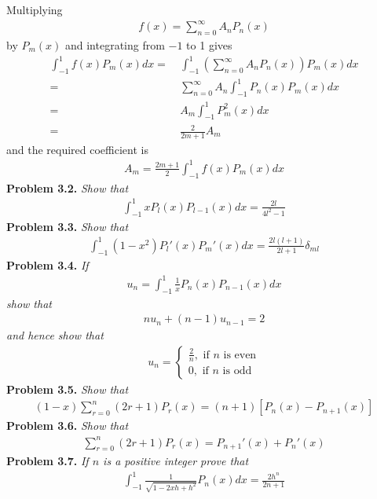\documentclass[a4paper]{article}
\numberwithin{equation}{section}
\begin{document}
Multiplying 
\begin{align}
f\left( x \right) = \sum\limits_{n = 0}^\infty  {{A_n}{P_n}\left( x \right)} 
\end{align}
by $P_m\left(x\right)$ and integrating from $-1$ to 1 gives
\begin{align}
\int_{ - 1}^1 {f\left( x \right){P_m}\left( x \right)dx}  =&\ \int_{ - 1}^1 {\left( {\sum\limits_{n = 0}^\infty  {{A_n}{P_n}\left( x \right)} } \right){P_m}\left( x \right)dx} \\
 =&\ \sum\limits_{n = 0}^\infty  {{A_n}\int_{ - 1}^1 {{P_n}\left( x \right){P_m}\left( x \right)dx} } \\
=&\ {A_m}\int_{ - 1}^1 {P_m^2\left( x \right)dx} \\
 =&\ \frac{2}{{2m + 1}}{A_m}
\end{align}
and the required coefficient is
\begin{align}
{A_m} = \frac{{2m + 1}}{2}\int_{ - 1}^1 {f\left( x \right){P_m}\left( x \right)dx} 
\end{align}
\textbf{Problem 3.2.} \textit{Show that}
\begin{align}
\int_{ - 1}^1 {x{P_l}\left( x \right){P_{l - 1}}\left( x \right)dx}  = \frac{{2l}}{{4{l^2} - 1}}
\end{align}
\textbf{Problem 3.3.} \textit{Show that}
\begin{align}
\int_{ - 1}^1 {\left( {1 - {x^2}} \right){P_l}'\left( x \right){P_m}'\left( x \right)dx}  = \frac{{2l\left( {l + 1} \right)}}{{2l + 1}}{\delta _{ml}}
\end{align}
\textbf{Problem 3.4.} \textit{If}
\begin{align}
{u_n} = \int_{ - 1}^1 {\frac{1}{x}{P_n}\left( x \right){P_{n - 1}}\left( x \right)dx} 
\end{align}
\textit{show that}
\begin{align}
n{u_n} + \left( {n - 1} \right){u_{n - 1}} = 2
\end{align}
\textit{and hence show that}
\begin{align}
{u_n} = \left\{ {\begin{array}{*{20}{c}}
{\frac{2}{n},\mbox{ if } n\mbox{ is even}}\\
{0,\mbox{ if } n\mbox{ is odd}}
\end{array}} \right.
\end{align}
\textbf{Problem 3.5.} \textit{Show that}
\begin{align}
\left( {1 - x} \right)\sum\limits_{r = 0}^n {\left( {2r + 1} \right){P_r}\left( x \right)}  = \left( {n + 1} \right)\left[ {{P_n}\left( x \right) - {P_{n + 1}}\left( x \right)} \right]
\end{align}
\textbf{Problem 3.6.} \textit{Show that}
\begin{align}
\sum\limits_{r = 0}^n {\left( {2r + 1} \right){P_r}\left( x \right)}  = {P_{n + 1}}'\left( x \right) + {P_n}'\left( x \right)
\end{align}
\textbf{Problem 3.7.} \textit{If $n$ is a positive integer prove that}
\begin{align}
\int_{ - 1}^1 {\frac{1}{{\sqrt {1 - 2xh + {h^2}} }}{P_n}\left( x \right)dx}  = \frac{{2{h^n}}}{{2n + 1}}
\end{align}
\end{document}
